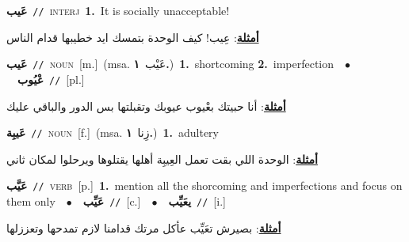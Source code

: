 \documentclass[10pt,a4paper,twoside]{article} %
\begin{document}
\begin{multicols}{2}
{\setlength\topsep{0pt}\textbf{\foreignlanguage{arabic}{عَيب}}\ {\color{gray}\texttt{//}\color{black}}\ \textsc{interj}\ \textbf{1.}~It is socially unacceptable!\  \begin{flushright}\color{gray}\foreignlanguage{arabic}{\textbf{\underline{\foreignlanguage{arabic}{أمثلة}}}: عِيب! كيف الوحدة بتمسك ايد خطيبها قدام الناس}\end{flushright}\color{black}} \vspace{2mm}

{\setlength\topsep{0pt}\textbf{\foreignlanguage{arabic}{عَيب}}\ {\color{gray}\texttt{//}\color{black}}\ \textsc{noun}\ [m.]\ \color{gray}(msa. \foreignlanguage{arabic}{عَيْب}~\foreignlanguage{arabic}{\textbf{١.}})\color{black}\ \textbf{1.}~shortcoming  \textbf{2.}~imperfection\ \ $\bullet$\ \ \setlength\topsep{0pt}\textbf{\foreignlanguage{arabic}{عْيُوب}}\ {\color{gray}\texttt{//}\color{black}}\ [pl.]\  \begin{flushright}\color{gray}\foreignlanguage{arabic}{\textbf{\underline{\foreignlanguage{arabic}{أمثلة}}}: أنا حبيتك بعْيوب عيوبك وتقبلتها بس الدور والباقي عليك}\end{flushright}\color{black}} \vspace{2mm}

{\setlength\topsep{0pt}\textbf{\foreignlanguage{arabic}{عَيبِة}}\ {\color{gray}\texttt{//}\color{black}}\ \textsc{noun}\ [f.]\ \color{gray}(msa. \foreignlanguage{arabic}{زِنا}~\foreignlanguage{arabic}{\textbf{١.}})\color{black}\ \textbf{1.}~adultery\  \begin{flushright}\color{gray}\foreignlanguage{arabic}{\textbf{\underline{\foreignlanguage{arabic}{أمثلة}}}: الوحدة اللي بقت تعمل العِيبِة أهلها يقتلوها ويرحلوا لمكان ثاني}\end{flushright}\color{black}} \vspace{2mm}

{\setlength\topsep{0pt}\textbf{\foreignlanguage{arabic}{عَيَّب}}\ {\color{gray}\texttt{//}\color{black}}\ \textsc{verb}\ [p.]\ \textbf{1.}~mention all the shorcoming and imperfections and focus on them only\ \ $\bullet$\ \ \setlength\topsep{0pt}\textbf{\foreignlanguage{arabic}{عَيِّب}}\ {\color{gray}\texttt{//}\color{black}}\ [c.]\ \ $\bullet$\ \ \setlength\topsep{0pt}\textbf{\foreignlanguage{arabic}{يعَيِّب}}\ {\color{gray}\texttt{//}\color{black}}\ [i.]\  \begin{flushright}\color{gray}\foreignlanguage{arabic}{\textbf{\underline{\foreignlanguage{arabic}{أمثلة}}}: بصيرش تعَيِّب عأكل مرتك قدامنا لازم تمدحها وتعززلها}\end{flushright}\color{black}} \vspace{2mm}


\end{multicols}
\end{document}
